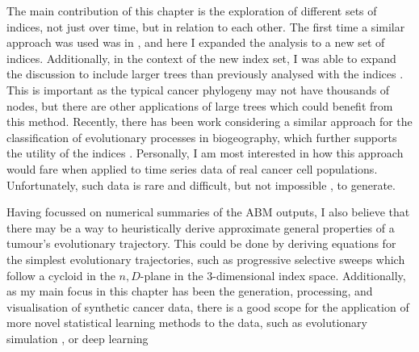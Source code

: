 The main contribution of this chapter is the exploration of different sets of
indices, not just over time, but in relation to each other. The first time a
similar approach was used was in \cite{noble_spatial_2022}, and here I expanded
the analysis to a new set of indices. Additionally, in the context of the new
index set, I was able to expand the discussion to include larger trees than
previously analysed with the indices \cite{noble_new_2023}. This is important
as the typical cancer phylogeny may not have thousands of nodes, but there are
other applications of large trees which could benefit from this method.
Recently, there has been work considering a similar approach for the
classification of evolutionary processes in biogeography, which further
supports the utility of the indices \cite{freitas_patch_2024}. Personally, I am
most interested in how this approach would fare when applied to time series data
of real cancer cell populations. Unfortunately, such data is rare and difficult,
but not impossible \cite{salehi_clonal_2021}, to generate. \par

Having focussed on numerical summaries of the ABM outputs, I also believe that
there may be a way to heuristically derive approximate general properties of a
tumour's evolutionary trajectory. This could be done by deriving equations for
the simplest evolutionary trajectories, such as progressive selective sweeps
which follow a cycloid in the $n,D$-plane in the $3$-dimensional index space.
Additionally, as my main focus in this chapter has been the generation,
processing, and visualisation of synthetic cancer data, there is a good scope
for the application of more novel statistical learning methods to the data,
such as evolutionary simulation \cite{herald_autonomous_2022}, or deep learning
